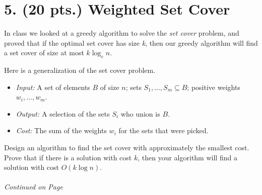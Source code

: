 \documentclass[11pt]{article}
\begin{document}
\newpage

\section*{5. (20  pts.) Weighted Set Cover}

In class we looked at a greedy algorithm to solve the \emph{set cover} problem,
and proved that if the optimal set cover has size \emph{k}, then our greedy 
algorithm will find a set cover of size at most $k\log_e{n}$.

Here is a generalization of the set cover problem. 

\begin{itemize}
\item \emph{Input:} A set of elements $B$ of size $n$; sets $S_1,\ldots,S_m \subseteq B$;
positive weights $w_i,\ldots,w_m$.

\item \emph{Output:} A selection of the sets $S_i$ who union is $B$.

\item \emph{Cost:} The sum of the weights $w_i$ for the sets that were picked.

\end{itemize}

Design an algorithm to find the set cover with approximately the smallest cost.
Prove that if there is a solution with cost $k$, then your algorithm will find a solution 
with cost $O(k\log n)$.

\label{pg:end-of-p5}


%
\paragraph{} \emph{Continued on Page \pageref{pg:p5-continuation}}


\newpage
\end{document}
